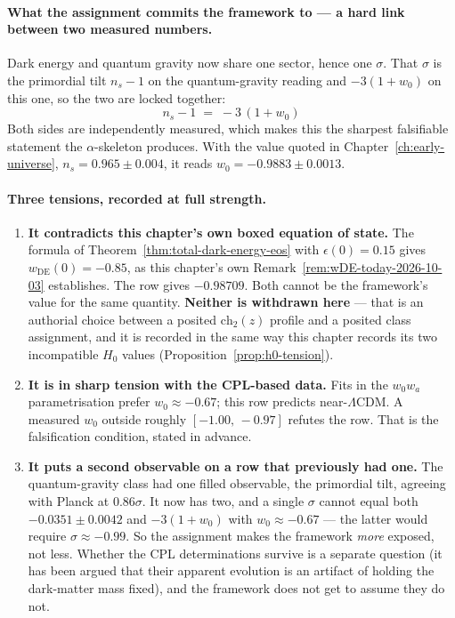 \begin{remark}
\paragraph{What the assignment commits the framework to --- a hard link between
two measured numbers.}
Dark energy and quantum gravity now share one sector, hence one $\sigma$. That
$\sigma$ is the primordial tilt $n_s - 1$ on the quantum-gravity reading and
$-3(1+w_0)$ on this one, so the two are locked together:
\begin{equation}
\boxed{\,n_s - 1 \;=\; -3\,(1 + w_0)\,}
\label{eq:tilt-w0-link}
\end{equation}
Both sides are independently measured, which makes this the sharpest falsifiable
statement the $\alpha$-skeleton produces. With the value quoted in
Chapter~\ref{ch:early-universe}, $n_s = 0.965 \pm 0.004$, it reads
$w_0 = -0.9883 \pm 0.0013$.

\paragraph{Three tensions, recorded at full strength.}
\begin{enumerate}
\item \textbf{It contradicts this chapter's own boxed equation of state.} The
formula of Theorem~\ref{thm:total-dark-energy-eos} with $\epsilon(0) = 0.15$ gives
$w_{\text{DE}}(0) = -0.85$, as this chapter's own
Remark~\ref{rem:wDE-today-2026-10-03} establishes. The row gives $-0.98709$.
Both cannot be the framework's value for the same quantity. \textbf{Neither is
withdrawn here} --- that is an authorial choice between a posited
$\text{ch}_2(z)$ profile and a posited class assignment, and it is recorded in
the same way this chapter records its two incompatible $H_0$ values
(Proposition~\ref{prop:h0-tension}).
\item \textbf{It is in sharp tension with the CPL-based data.} Fits in the
$w_0 w_a$ parametrisation prefer $w_0 \approx -0.67$; this row predicts
near-$\Lambda$CDM. A measured $w_0$ outside roughly $[-1.00,\,-0.97]$ refutes
the row. That is the falsification condition, stated in advance.
\item \textbf{It puts a second observable on a row that previously had one.} The
quantum-gravity class had one filled observable, the primordial tilt, agreeing
with Planck at $0.86\sigma$. It now has two, and a single $\sigma$ cannot equal
both $-0.0351 \pm 0.0042$ and $-3(1+w_0)$ with $w_0 \approx -0.67$ --- the
latter would require $\sigma \approx -0.99$. So the assignment makes the
framework \emph{more} exposed, not less. Whether the CPL determinations survive
is a separate question (it has been argued that their apparent evolution is an
artifact of holding the dark-matter mass fixed), and the framework does not get
to assume they do not.
\end{enumerate}


\end{remark}
